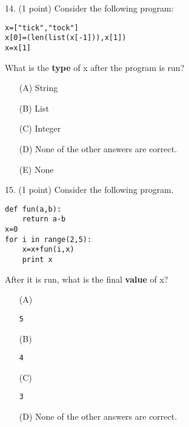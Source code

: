 \documentclass{article}
\begin{document}
\noindent
\begin{minipage}{\textwidth}
14. (1 point)
Consider the following program:
\begin{verbatim}
x=["tick","tock"]
x[0]=(len(list(x[-1])),x[1])
x=x[1]
\end{verbatim}
What is the \textbf{type} of x after the program is run?

\begin{enumerate}
\item[(A)]
String

\item[(B)]
List

\item[(C)]
Integer

\item[(D)]
None of the other answers are correct.

\item[(E)]
None

\end{enumerate}
\end{minipage}
\vspace{10em}
\filbreak\vfil{}\vfilneg

\noindent
\begin{minipage}{\textwidth}
15. (1 point)
Consider the following program.
\begin{verbatim}
def fun(a,b):
    return a-b
x=0
for i in range(2,5):
    x=x+fun(i,x)
    print x
\end{verbatim}
After it is run, what is the final \textbf{value} of x?

\begin{enumerate}
\item[(A)]
\begin{verbatim}5\end{verbatim}

\item[(B)]
\begin{verbatim}4\end{verbatim}

\item[(C)]
\begin{verbatim}3\end{verbatim}

\item[(D)]
None of the other answers are correct.

\end{enumerate}
\end{minipage}
\vspace{10em}
\filbreak\vfil{}\vfilneg
\end{document}
